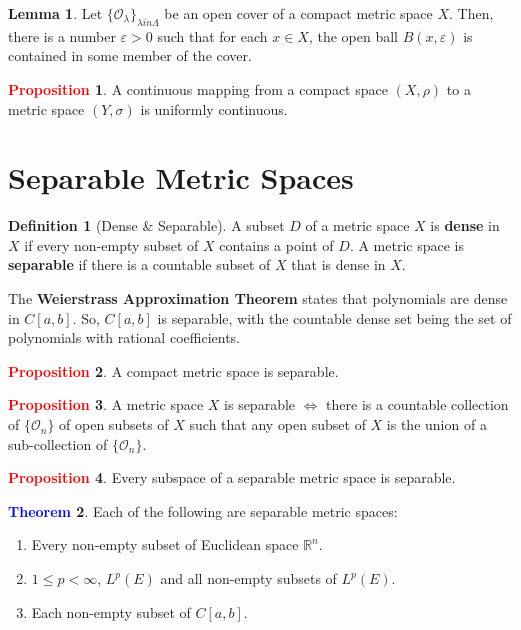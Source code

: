 \documentclass[11pt]{article}
\newcommand{\open}[0]{\mathcal{O}}
\theoremstyle{definition}
\theoremstyle{definition}
\newcommand{\R}[0]{\mathbb{R}}
\newtheorem{theorem}{\textcolor{blue}{Theorem}}
\newtheorem{lemma}[theorem]{Lemma}
\theoremstyle{definition}
\newtheorem{definition}{\textcolor{OliveGreen}{Definition}}
\newtheorem{prop}{\textcolor{red}{Proposition}}
\theoremstyle{remark}
\begin{document}
\begin{lemma}
	Let $\{ \open_\lambda \}_{\lambda in \Lambda}$ be an open cover of a compact metric space $X$. Then, there is a number $\varepsilon > 0$ such that for each $x \in X$, the open ball $B(x, \varepsilon) $ is contained in some member of the cover. 
\end{lemma}

\begin{prop}
	A continuous mapping from a compact space $(X, \rho)$ to a metric space $(Y, \sigma)$ is uniformly continuous. 
\end{prop}

\section{Separable Metric Spaces}

\begin{definition}[Dense \& Separable] A subset $D $ of a metric space $X$ is \textbf{dense} in $X$ if every non-empty subset of $X$ contains a point of $D$. A metric space is \textbf{separable} if there is a countable subset of $X$ that is dense in $X$. 	
\end{definition}

The \textbf{Weierstrass Approximation Theorem} states that polynomials are dense in $C[a,b]$. So, $C[a,b]$ is separable, with the countable dense set being the set of polynomials with rational coefficients. 

\begin{prop}
	A compact metric space is separable. 
\end{prop}

\begin{prop}
	A metric space $X$ is separable $\iff$ there is a countable collection of $\{ \open_n \}$ of open subsets of $X$ such that any open subset of $X$ is the union of a sub-collection of $\{ \open_n \}$. 
\end{prop}

\begin{prop}
	Every subspace of a separable metric space is separable. 
\end{prop}

\begin{theorem}
	Each of the following are separable metric spaces: 
	\begin{enumerate}[noitemsep]
		\item Every non-empty subset of Euclidean space $\R^n$. 
		\item $1 \leq p < \infty$, $L^p(E)$ and all non-empty subsets of $L^p(E)$. 
		\item Each non-empty subset of $C[a,b]$. 
	\end{enumerate}
\end{theorem}
\end{document}
